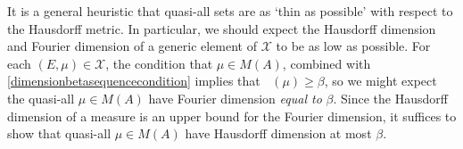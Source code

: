 \documentclass[12pt,reqno]{article}
\DeclareMathOperator{\fordim}{\dim_{\mathbf{F}}}
\DeclareMathOperator{\TT}{\mathbf{T}}
\newtheorem{lemma}[theorem]{Lemma}
\begin{document}
\begin{comment}

\begin{lemma}
    For quasi-all $(E,\mu) \in \mathcal{X}$, $\text{supp}(\mu) = E$.
\end{lemma}
\begin{proof}
    For each closed set $K \subset \TT^d$ with nonempty interior, let $A(K)$ be the family of all $(E,\mu) \in X$ such that $E \cap K \neq \emptyset$ and $\mu(K) = 0$. The set $A(K)$ is clearly closed in $X$. Moreover, this set is nowhere dense; Fix $(E,\mu) \in A(K)$ and $\varepsilon > 0$. Then we can find a smooth probability density $\psi \in C^\infty(\TT^d)$ supported on $K^\circ \cap E_\varepsilon$. We then define $\mu_\varepsilon = (1 - \varepsilon) \mu + \varepsilon \psi$. Now
    \[ \| \mu - \mu_\varepsilon \|_A \leq \varepsilon \left( \| \mu \|_A + \| \psi \|_A \right) \lesssim \varepsilon. \]
    Moreover, $\mu_\varepsilon$ is supported on $\overline{E_\varepsilon}$, so
    \[ d_X((E,\mu), (\overline{E_\varepsilon}, \mu_\varepsilon)) \lesssim \varepsilon. \]
    If we let $A = \bigcup_{n = 1}^\infty A(K_n)$, where $\{ K_n \}$ is the family of all closed cubes in $\TT^d$ whose corners have rational coordinates, then quasi-all $(E,\mu) \in X$ belong to $A^c$. But $A^c$ is precisely the family of pairs $(E,\mu)$ with $\text{supp}(\mu) = E$.
\end{proof}

\end{comment}

It is a general heuristic that quasi-all sets are as `thin as possible' with respect to the Hausdorff metric. In particular, we should expect the Hausdorff dimension and Fourier dimension of a generic element of $\mathcal{X}$ to be as low as possible. For each $(E,\mu) \in \mathcal{X}$, the condition that $\mu \in M(A)$, combined with \eqref{dimensionbetasequencecondition} implies that $\fordim(\mu) \geq \beta$, so we might expect the quasi-all $\mu \in M(A)$ have Fourier dimension \emph{equal to} $\beta$. Since the Hausdorff dimension of a measure is an upper bound for the Fourier dimension, it suffices to show that quasi-all $\mu \in M(A)$ have Hausdorff dimension at most $\beta$.
\end{document}
